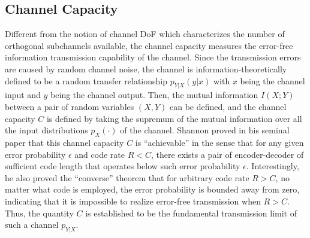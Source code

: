 \documentclass[journal,twocolumn]{IEEEtran}
\begin{document}

\subsection{Channel Capacity}
\label{Sec_2_Subsec_2}
Different from the notion of channel DoF which characterizes the number of orthogonal subchannels available, the channel capacity measures the error-free information transmission capability of the channel. 
Since the transmission errors are caused by random channel noise, the channel is information-theoretically defined to be a random transfer relationship $p_{Y|X}(y|x)$ with $x$ being the channel input and $y$ being the channel output. 
Then, the mutual information $I(X; Y)$ between a pair of random variables $(X, Y)$ can be defined, and the channel capacity $C$ is defined by taking the supremum of the mutual information over all the input distributions $p_X(\cdot)$ of the channel. Shannon proved in his seminal paper \cite{shannon1948mathematical} that this channel capacity $C$ is ``achievable'' in the sense that for any given error probability $\epsilon$ and code rate $R<C$, there exists a pair of encoder-decoder of sufficient code length that operates below such error probability $\epsilon$. 
Interestingly, he also proved the ``converse'' theorem that for arbitrary code rate $R>C$, no matter what code is employed, the error probability is bounded away from zero, indicating that it is impossible to realize error-free transmission when $R>C$. Thus, the quantity $C$ is established to be the fundamental transmission limit of such a channel $p_{Y|X}$. 
\end{document}
